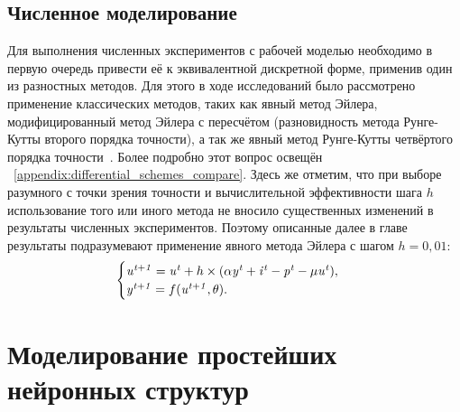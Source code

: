 
%
%


\subsection{Численное моделирование}

Для выполнения численных экспериментов с рабочей моделью необходимо в первую очередь привести её к эквивалентной дискретной форме, применив один из разностных методов. Для этого в ходе исследований было рассмотрено применение классических методов, таких как явный метод Эйлера, модифицированный метод Эйлера с пересчётом (разновидность метода Рунге-Кутты второго порядка точности), а так же явный метод Рунге-Кутты четвёртого порядка точности~\cite{Hairer1990}. Более подробно этот вопрос освещён \inappendix~\ref{appendix:differential_schemes_compare}. Здесь же отметим, что при выборе разумного с точки зрения точности и вычислительной эффективности шага $h$ использование того или иного метода не вносило существенных изменений в результаты численных экспериментов. Поэтому описанные далее в главе результаты подразумевают применение явного метода Эйлера с шагом $h = 0,01$:
\begin{equation*}
    \begin{cases}
        \mathit{u^{t+1}} = \mathit{u^{t}} + h \times ( \alpha\mathit{y^{t}} + \mathit{i^{t}} - \mathit{p^{t}} - \mu\mathit{u^{t}} ), \\ 
        \mathit{y^{t+1}} = f(\mathit{u^{t+1}}, \theta).
    \end{cases}
\end{equation*}


\section{Моделирование простейших нейронных структур} \label{section:neuron_modeling}

